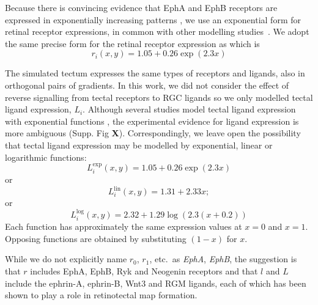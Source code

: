 \documentclass[11pt, a4paper]{article}
\begin{document}
Because there is convincing evidence that EphA and EphB receptors are
expressed in exponentially increasing
patterns \citep{reber_relative_2004,feldheim_genetic_2000,brown_topographic_2000,koulakov_stochastic_2004},
we use an exponential form for retinal receptor expressions, in common with
other modelling
studies~\citep{reber_relative_2004,koulakov_stochastic_2004,simpson_simple_2011}.
We adopt the same precise form for the retinal receptor expression
as \citet{simpson_simple_2011} which is
\begin{equation} \label{e:retrcpt}
r_i(x,y) = 1.05 + 0.26 \exp(2.3 x)
\end{equation}

The simulated tectum expresses the same types of receptors and ligands, also
in orthogonal pairs of gradients. In this work, we did not consider the effect
of reverse signalling from tectal receptors to RGC ligands so we only modelled
tectal ligand expression, $L_i$. Although several studies model tectal ligand
expression with exponential functions \citep{koulakov_stochastic_2004}, the
experimental evidence for ligand expression is more ambiguous (Supp. Fig
\textbf{X}). Correspondingly, we leave open the possibility that tectal ligand
expression may be modelled by exponential, linear or logarithmic functions:
\begin{equation} \label{e:tecligexp}
L_i^{\text{exp}}(x,y) = 1.05 + 0.26 \exp(2.3 x)
\end{equation}
or
\begin{equation}
L_i^{\text{lin}}(x,y) = 1.31 + 2.33 x;
\end{equation}
or
\begin{equation}
L_i^{\text{log}}(x,y) = 2.32 + 1.29 \log (2.3(x+0.2))
\end{equation}
Each function has approximately the same expression values at $x=0$ and
$x=1$. Opposing functions are obtained by substituting $(1-x)$ for $x$.

While we do not explicitly name $r_0$, $r_1$,
etc.~as \emph{EphA}, \emph{EphB}, the suggestion is that $r$ includes EphA,
EphB, Ryk \citep{schmitt_wntryk_2006} and
Neogenin \citep{rajagopalan_neogenin_2004} receptors and that $l$ and $L$
include the ephrin-A, ephrin-B, Wnt3 \citep{schmitt_wntryk_2006} and
RGM \citep{monnier_rgm_2002} ligands, each of which has been shown to play a
role in retinotectal map formation.
\end{document}
